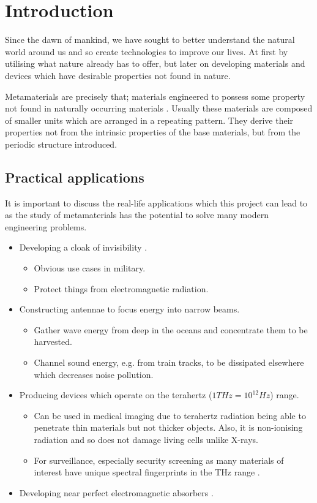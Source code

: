 \chapter{Introduction}
Since the dawn of mankind, we have sought to better understand the natural
world around us and so create technologies to improve our lives. At first by
utilising what nature already has to offer, but later on developing materials
and devices which have desirable properties not found in nature.

Metamaterials are precisely that; materials engineered to possess some property
not found in naturally occurring materials \cite{briefintro}. Usually these
materials are composed of smaller units which are arranged in a repeating
pattern. They derive their properties not from the intrinsic properties of the
base materials, but from the periodic structure introduced.

\section{Practical applications}
It is important to discuss the real-life applications which this project can
lead to as the study of metamaterials has the potential to solve many modern
engineering problems.

\begin{itemize}
\item Developing a cloak of invisibility \cite{emcloak}.
      \begin{itemize}
      \item Obvious use cases in military.
      \item Protect things from electromagnetic radiation.
      \end{itemize}
\item Constructing antennae to focus energy into narrow beams.
      \cite{diremi,antennasol}
      \begin{itemize}
      \item Gather wave energy from deep in the oceans and concentrate them to
            be harvested.
      \item Channel sound energy, e.g. from train tracks, to be dissipated
            elsewhere which decreases noise pollution.
      \end{itemize}
\item Producing devices which operate on the terahertz ($1THz=10^{12}Hz$) range.
      \cite{THz}
      \begin{itemize}
      \item Can be used in medical imaging due to terahertz radiation being
            able to penetrate thin materials but not thicker objects. Also, it
            is non-ionising radiation and so does not damage living cells
            unlike X-rays.
      \item For surveillance, especially security screening as many materials
            of interest have unique spectral fingerprints in the THz range
            \cite{Thzsec}.
      \end{itemize}
\item Developing near perfect electromagnetic absorbers \cite{absorbing}.
\end{itemize}

